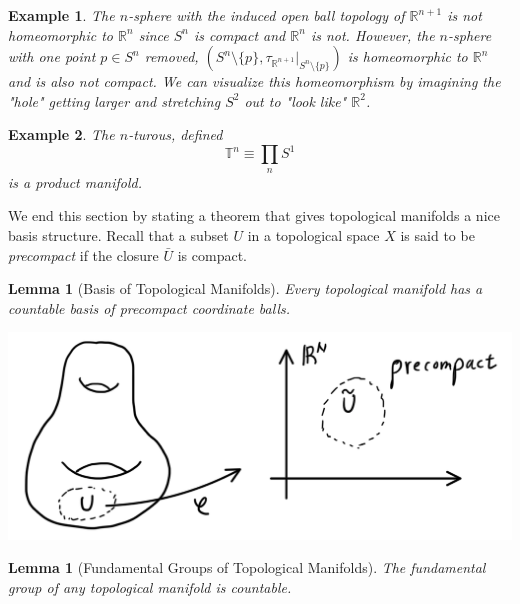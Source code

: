 \documentclass{article}
\newtheorem{lemma}[theorem]{Lemma}
\newtheorem{example}{Example}[section]
\theoremstyle{remark}
\theoremstyle{definition}
\begin{document}
\begin{example}
The $n$-sphere with the induced open ball topology of $\mathbb{R}^{n+1}$ is not homeomorphic to $\mathbb{R}^{n}$ since $S^{n}$ is compact and $\mathbb{R}^{n}$ is not. However, the $n$-sphere with one point $p \in S^{n}$ removed, $(S^{n} \setminus{\{p\}}, \tau_{\mathbb{R}^{n+1}} |_{S^{n} \setminus{\{p\}}})$ \textit{is} homeomorphic to $\mathbb{R}^{n}$ and is also not compact. We can visualize this homeomorphism by imagining the "hole" getting larger and stretching $S^{2}$ out to "look like" $\mathbb{R}^{2}$.
\end{example}

\begin{example}
The $n$-turous, defined
\[\mathbb{T}^n \equiv \prod_n S^1\]
is a product manifold. 
\end{example}

We end this section by stating a theorem that gives topological manifolds a nice basis structure. Recall that a subset $U$ in a topological space $X$ is said to be \textit{precompact} if the closure $\bar{U}$ is compact. 

\begin{lemma}[Basis of Topological Manifolds]
Every topological manifold has a countable basis of precompact coordinate balls. 
\begin{center}
    \includegraphics[scale=0.23]{img/Precompact_Basis.PNG}
\end{center}
\end{lemma}

\begin{lemma}[Fundamental Groups of Topological Manifolds]
The fundamental group of any topological manifold is countable. 
\end{lemma}
\end{document}
